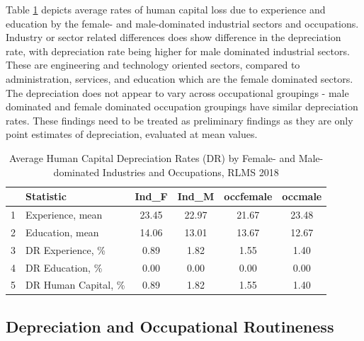 \documentclass[alpha-refs]{wiley-article-02b}
\begin{document}
Table \ref{tab:2.3} depicts average rates of human capital loss due to experience and education by the female- and male-dominated industrial sectors and occupations. Industry or sector related differences does show difference in the depreciation rate, with depreciation rate being higher for male dominated industrial sectors. These are engineering and technology oriented sectors, compared to administration, services, and education which are the female dominated sectors. The depreciation does not appear to vary across occupational groupings - male dominated and female dominated occupation groupings have similar depreciation rates. These findings need to be treated as preliminary findings as they are only point estimates of depreciation, evaluated at mean values. 

\begin{table}[htbp!]
	\centering 
	\caption{Average Human Capital Depreciation Rates (DR) by Female- and Male-dominated Industries and Occupations, RLMS 2018} 
	\label{tab:2.3} 
	\begin{tabular}{clcccc}
		\hline
		& \textbf{Statistic} &\textbf{Ind\_F}& \textbf{Ind\_M} & \textbf{occfemale} & \textbf{occmale} \\ 
		\hline
		1 & Experience, mean  & 23.45 & 22.97 & 21.67 & 23.48 \\ 
		2 & Education, mean & 14.06 & 13.01 & 13.67 & 12.67 \\ 
		\midrule
		3 & DR Experience, \% & 0.89 & 1.82 & 1.55 & 1.40 \\ 
		4 & DR Education, \% & 0.00 & 0.00 & 0.00 & 0.00 \\ 
		5 & DR Human Capital, \% & 0.89 & 1.82 & 1.55 & 1.40 \\ 
		\hline
	\end{tabular}
\end{table} 


\subsection{Depreciation and Occupational Routineness}
\end{document}
